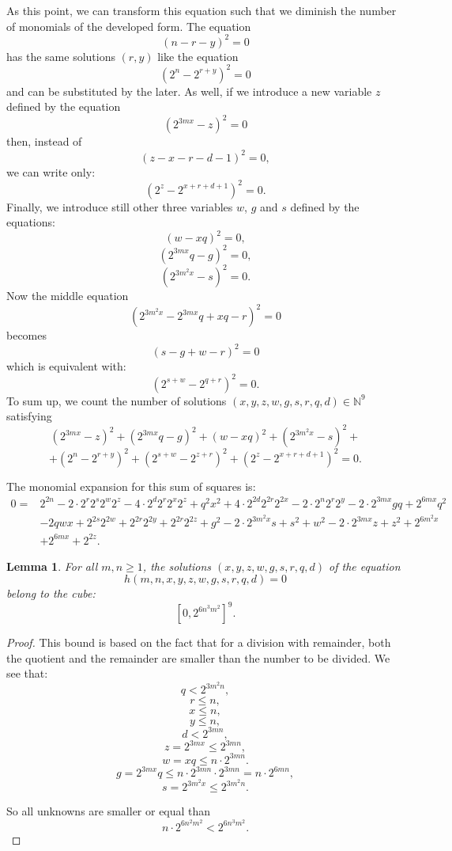 \documentclass[10pt]{article}
\theoremstyle{plain}
\newtheorem{lemma}{Lemma}[section]
\begin{document}
As this point, we can transform this equation such that we diminish the number of monomials of the developed form.
The equation
$$(n-r-y)^2 = 0$$
has the same solutions $(r,y)$ like the equation
$$(2^n - 2^{r+y})^2 = 0$$
and can be substituted by the later. As well, if we introduce a new variable $z$ defined by the equation
$$(2^{3mx}  - z)^2 = 0$$
then, instead of
$$(z - x - r - d - 1)^2 = 0,$$
we can write only:
$$( 2^z - 2^{x + r + d + 1} )^2 = 0.$$
Finally, we introduce still other three variables $w$, $g$ and $s$ defined by the equations:
$$(w - xq)^2 = 0,$$
$$(2^{3mx} q - g )^2 = 0,$$
$$( 2^{3m^2 x} - s)^2 = 0.$$
Now the middle equation
$$(2^{3m^2 x} - 2^{3mx} q + xq - r)^2 =0$$
becomes
$$(s - g + w - r)^2 = 0$$
which is equivalent with:
$$( 2^{s + w} - 2^{q+r} )^2 = 0.$$
To sum up, we count the number of solutions $(x,y,z,w,g,s,r,q,d) \in \mathbb N^9$ satisfying
$$ (2^{3mx} - z)^2 + (2^{3mx} q - g )^2 + (w - xq)^2 + (2^{3m^2x} - s)^2 + $$$$ + (2^n - 2^{r+y})^2 + ( 2^{s + w} - 2^{z+r} )^2  + ( 2^z - 2^{x + r + d + 1} )^2 = 0.$$

The monomial expansion for this sum of squares is:
\begin{align*}
0 =
& 2^{2 n}
- 2 \cdot 2^{r} 2^{s} 2^{w} 2^{z}
- 4 \cdot 2^{d} 2^{r} 2^{x} 2^{z}
+ q^{2} x^{2}
+ 4 \cdot 2^{2 d} 2^{2 r} 2^{2 x}
- 2 \cdot 2^{n} 2^{r} 2^{y}
- 2 \cdot 2^{3 m x} g q
+ 2^{6 m x} q^{2} \\
& - 2 q w x
+ 2^{2 s} 2^{2 w}
+ 2^{2 r} 2^{2 y}
+ 2^{2 r} 2^{2 z}
+ g^{2}
- 2 \cdot 2^{3 m^{2} x} s
+ s^{2}
+ w^{2}
- 2 \cdot 2^{3 m x} z
+ z^{2}
+ 2^{6 m^{2} x} \\
& + 2^{6 m x}
+ 2^{2 z} .
\end{align*}

\begin{lemma} \label{lemma:solutions}
    For all $m,n \geq 1$, the solutions $(x,y,z,w, g, s,r,q,d)$ of the equation $$h(m,n,x,y,z,w,g,s,r,q,d) = 0$$ belong to the cube:
    $$[0, 2^{6n^3m^2}]^9.$$
\end{lemma}

\begin{proof}
    This bound is based on the fact that for a division with remainder, both the quotient and the remainder are smaller than the number to be divided. We see that:
    $$ q < 2^{3m^2n},$$
    $$r \leq n,$$
    $$x \leq n,$$
    $$ y \leq n, $$
    $$ d < 2^{3mn},$$
    $$ z = 2^{3mx} \leq 2^{3mn},$$
    $$ w = xq \leq n \cdot 2^{3mn}.$$
    $$ g =  2^{3mx} q \leq n \cdot 2^{3mn} \cdot 2^{3mn} = n \cdot 2^{6mn},$$
    $$ s = 2^{3m^2x} \leq 2^{3m^2n}.$$

    So all unknowns are smaller or equal than
    $$n \cdot 2^{6n^2m^2} < 2^{6n^3m^2}.$$
    \end{proof}
\end{document}
